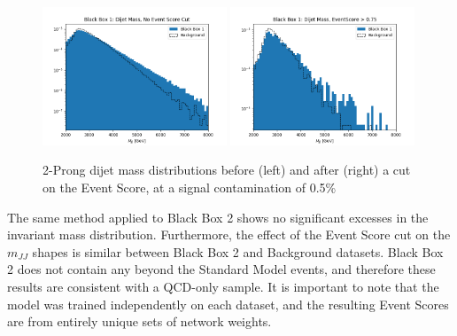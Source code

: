 \documentclass[letterpaper,11pt]{article}
\begin{document}
\begin{figure}[h!]
	\begin{center}
		\includegraphics[width=0.49\textwidth]{imgs/BB1.png}
		\includegraphics[width=0.49\textwidth]{imgs/BB1_Cut.png}
	\end{center}
	\caption{2-Prong dijet mass distributions before (left) and after (right) a cut on the Event Score, at a signal contamination of 0.5\%}
	\label{fig:bb1}
\end{figure}

The same method applied to Black Box 2 shows no significant excesses in the invariant mass distribution. Furthermore, the effect of the Event Score cut on the $m_{JJ}$ shapes is similar between Black Box 2 and Background datasets. Black Box 2 does not contain any beyond the Standard Model events, and therefore these results are consistent with a QCD-only sample. It is important to note that the model was trained independently on each dataset, and the resulting Event Scores are from entirely unique sets of network weights.
\end{document}
